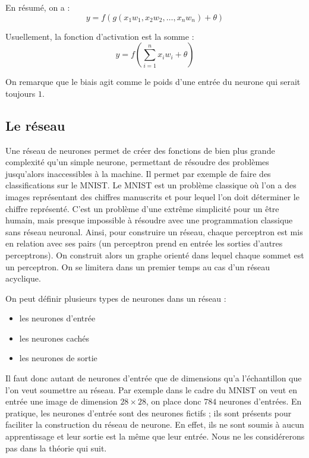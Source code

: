 \medskip

En résumé, on a :
\[y = f(g(x_1w_1, x_2w_2, \ldots , x_nw_n) + \theta) \]

\medskip

Usuellement, la fonction d'activation est la somme :
\[y = f(\sum_{i=1}^n x_iw_i + \theta) \]

\medskip

On remarque que le biais agit comme le poids d'une entrée du neurone qui serait
toujours $1$.

\subsection{Le réseau}

Une réseau de neurones permet de créer des fonctions de bien plus grande
complexité qu'un simple neurone, permettant de résoudre des problèmes
jusqu'alors inaccessibles à la machine. Il permet par exemple de faire des
classifications sur le MNIST. Le MNIST est un problème classique où l'on a des
images représentant des chiffres manuscrits et pour lequel l'on doit déterminer
le chiffre représenté. C'est un problème d'une extrême simplicité pour un être
humain, mais presque impossible à résoudre avec une programmation classique
sans réseau neuronal. Ainsi, pour construire un réseau, chaque perceptron est
mis en relation avec ses pairs (un perceptron prend en entrée les sorties
d'autres perceptrons). On construit alors un graphe orienté dans lequel chaque
sommet est un perceptron. On se limitera dans un premier temps au cas d'un
réseau acyclique.

\bigskip

On peut définir plusieurs types de neurones dans un réseau :
\begin{itemize}
\item les neurones d'entrée
\item les neurones cachés
\item les neurones de sortie
\end{itemize}

\bigskip

Il faut donc autant de neurones d'entrée que de dimensions qu'a l'échantillon
que l'on veut soumettre au réseau. Par exemple dans le cadre du MNIST
on veut en entrée une image de dimension $28 \times 28$, on place donc $784$
neurones d'entrées. En pratique, les neurones d'entrée sont des neurones fictifs
; ils sont présents pour faciliter la construction du réseau de neurone.
En effet, ils ne sont soumis à aucun apprentissage et leur sortie est la même
que leur entrée. Nous ne les considérerons pas dans la théorie qui suit.

